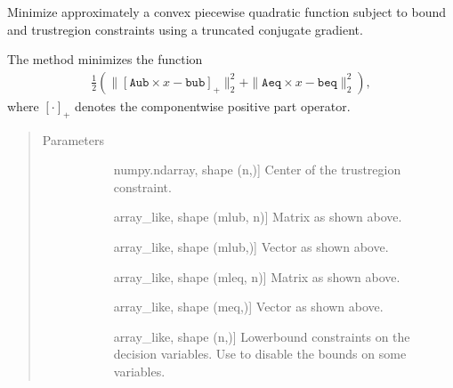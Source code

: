\documentclass[letterpaper,10pt,english]{sphinxmanual}
\begin{document}
\begin{fulllineitems}
\label{\detokenize{refs/generated/cobyqa.linalg.cpqp:cobyqa.linalg.cpqp}}
\sphinxAtStartPar
Minimize approximately a convex piecewise quadratic function subject to
bound and trust\sphinxhyphen{}region constraints using a truncated conjugate gradient.

\sphinxAtStartPar
The method minimizes the function
\begin{equation*}
\begin{split}\frac{1}{2} ( \| [ \mathtt{Aub} \times x - \mathtt{bub} ]_+\|_2^2 +
\| \mathtt{Aeq} \times x - \mathtt{beq} \|_2^2 ),\end{split}
\end{equation*}
\sphinxAtStartPar
where \([ \cdot ]_+\) denotes the componentwise positive part operator.
\begin{quote}\begin{description}
\item[{Parameters}] \leavevmode\begin{description}
\item[{}] \leavevmode{[}numpy.ndarray, shape (n,){]}
\sphinxAtStartPar
Center of the trust\sphinxhyphen{}region constraint.

\item[{}] \leavevmode{[}array\_like, shape (mlub, n){]}
\sphinxAtStartPar
Matrix  as shown above.

\item[{}] \leavevmode{[}array\_like, shape (mlub,){]}
\sphinxAtStartPar
Vector  as shown above.

\item[{}] \leavevmode{[}array\_like, shape (mleq, n){]}
\sphinxAtStartPar
Matrix  as shown above.

\item[{}] \leavevmode{[}array\_like, shape (meq,){]}
\sphinxAtStartPar
Vector  as shown above.

\item[{}] \leavevmode{[}array\_like, shape (n,){]}
\sphinxAtStartPar
Lower\sphinxhyphen{}bound constraints on the decision variables. Use  to
disable the bounds on some variables.


\end{description}
\end{description}
\end{quote}
\end{fulllineitems}
\end{document}
